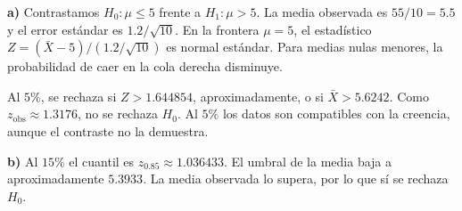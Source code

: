 \textbf{a)} Contrastamos $H_0:\mu\le5$ frente a $H_1:\mu>5$.
La media observada es $55/10=5.5$ y el error estándar
es $1.2/\sqrt{10}$. En la frontera $\mu=5$, el estadístico
$Z=(\bar X-5)/(1.2/\sqrt{10})$ es normal estándar.
Para medias nulas menores, la probabilidad de caer en la
cola derecha disminuye.

Al $5\%$, se rechaza si $Z>1.644854$, aproximadamente,
o si $\bar X>5.6242$. Como $z_{\mathrm{obs}}\approx1.3176$,
no se rechaza $H_0$. Al $5\%$ los datos son compatibles
con la creencia, aunque el contraste no la demuestra.

\textbf{b)} Al $15\%$ el cuantil es $z_{0.85}\approx1.036433$.
El umbral de la media baja a aproximadamente $5.3933$.
La media observada lo supera, por lo que sí se rechaza $H_0$.
